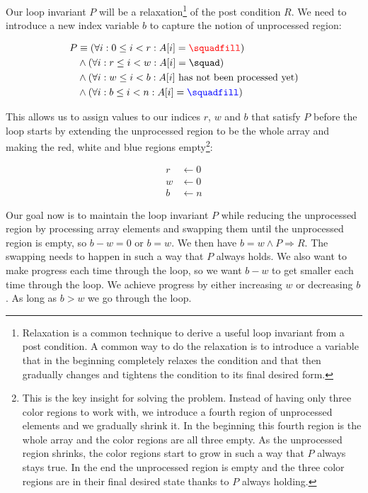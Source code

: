 Our loop invariant $P$ will be a relaxation\footnote{Relaxation is a common technique to derive a useful loop invariant from a post condition. A common way to do the relaxation is to introduce a variable that in the beginning completely relaxes the condition and that then gradually changes and tightens the condition to its final desired form.} of the post condition $R$. We need to introduce a new index variable $b$ to capture the notion of unprocessed region:

\begin{align*}
P & \equiv (\forall i: 0 \leq i < r: A[i] = {\color{red} \squadfill}) \\
  & \wedge (\forall i: r \leq i < w: A[i] = \squad) \\
  & \wedge (\forall i: w \leq i < b: A[i]  \text{ has not been processed yet}) \\
  & \wedge (\forall i: b \leq i < n: A[i] = {\color{blue} \squadfill})
\end{align*}

This allows us to assign values to our indices $r$, $w$ and $b$ that satisfy $P$ before the loop starts by extending the unprocessed region to be the whole array and making the red, white and blue regions empty\footnote{This is the key insight for solving the problem. Instead of having only three color regions to work with, we introduce a fourth region of unprocessed elements and we gradually shrink it. In the beginning this fourth region is the whole array and the color regions are all three empty. As the unprocessed region shrinks, the color regions start to grow in such a way that $P$ always stays true. In the end the unprocessed region is empty and the three color regions are in their final desired state thanks to $P$ always holding.}:

\begin{align*}
r & \leftarrow 0 \\
w & \leftarrow 0 \\
b & \leftarrow n
\end{align*}

Our goal now is to maintain the loop invariant $P$ while reducing the unprocessed region by processing array elements and swapping them until the unprocessed region is empty, so $b - w = 0$ or $b = w$. We then have $b = w \wedge P \Rightarrow R$. The swapping needs to happen in such a way that $P$ always holds. We also want to make progress each time through the loop, so we want $b - w$ to get smaller each time through the loop. We achieve progress by either increasing $w$ or decreasing $b$. As long as $b > w$ we go through the loop.

